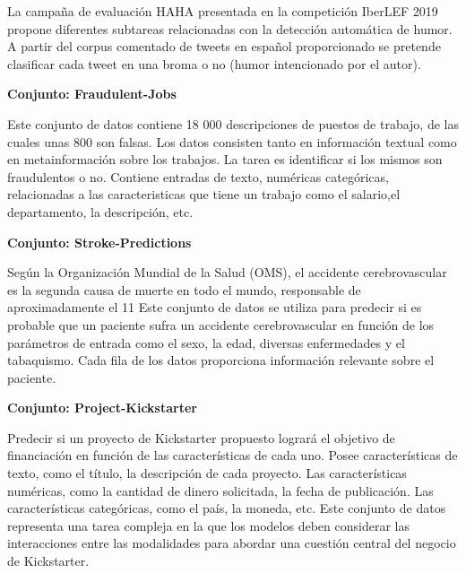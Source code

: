 \begin{annexes}
La campaña de evaluación HAHA presentada en la competición IberLEF 2019 propone diferentes subtareas relacionadas con la detección automática de humor. A partir del 
corpus comentado de tweets en español proporcionado se pretende clasificar cada tweet en una broma o no (humor intencionado por el autor).

\begin{flushleft} 
    { \textbf{Conjunto: Fraudulent-Jobs}}\label{description:fraudulent}
\end{flushleft}

Este conjunto de datos contiene 18 000 descripciones de puestos de trabajo, de las cuales unas 800 son falsas. Los datos consisten tanto en información textual como en 
metainformación sobre los trabajos. La tarea es identificar si los mismos son fraudulentos o no. Contiene entradas de texto, numéricas categóricas, relacionadas a las 
caracteristicas que tiene un trabajo como el salario,el departamento, la descripción, etc. 


\begin{flushleft} 
    { \textbf{Conjunto: Stroke-Predictions}}\label{description:stroke}
\end{flushleft}

Según la Organización Mundial de la Salud (OMS), el accidente cerebrovascular es la segunda causa de muerte en todo el mundo, responsable de aproximadamente el 11%
Este conjunto de datos se utiliza para predecir si es probable que un paciente sufra un accidente cerebrovascular en función de los parámetros de entrada como el sexo, la edad, diversas enfermedades y el tabaquismo. Cada fila de los datos proporciona información relevante sobre el paciente.

\begin{flushleft} 
    { \textbf{Conjunto: Project-Kickstarter}}\label{description:project}
\end{flushleft}

Predecir si un proyecto de Kickstarter propuesto logrará el objetivo de financiación en función de las características de cada uno. Posee características de texto, como el título, la descripción de cada proyecto. Las características numéricas, como la cantidad de dinero solicitada, la fecha de publicación. Las características categóricas, como el país, la moneda, etc. Este conjunto de datos representa una tarea compleja en la que los modelos deben considerar las interacciones entre las modalidades para abordar una cuestión central del negocio de Kickstarter.


\end{annexes}
